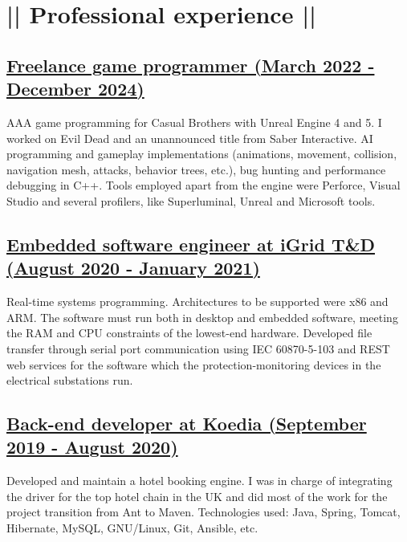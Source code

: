 \section*{|| Professional experience ||}
\subsection*{\underline{Freelance game programmer (March 2022 - December 2024)}}
AAA game programming for Casual Brothers with Unreal Engine 4 and 5. I worked on Evil Dead and an unannounced title from Saber Interactive. AI programming and gameplay implementations (animations, movement, collision, navigation mesh, attacks, behavior trees, etc.), bug hunting and performance debugging in C++. Tools employed apart from the engine were Perforce, Visual Studio and several profilers, like Superluminal, Unreal and Microsoft tools.

\subsection*{\underline{Embedded software engineer at iGrid T\&D (August 2020 - January 2021)}}
Real-time systems programming. Architectures to be supported were x86 and ARM. The software must run both in desktop and embedded software, meeting the RAM and CPU constraints of the lowest-end hardware. Developed file transfer through serial port communication using IEC 60870-5-103 and REST web services for the software which the protection-monitoring devices in the electrical substations run.

\subsection*{\underline{Back-end developer at Koedia (September 2019 - August 2020)}}
Developed and maintain a hotel booking engine. I was in charge of integrating the driver	for the top hotel chain in the UK and did most of the work for the project transition from 	Ant to Maven. Technologies used: Java, Spring, Tomcat, Hibernate, MySQL, GNU/Linux, Git, Ansible, etc.